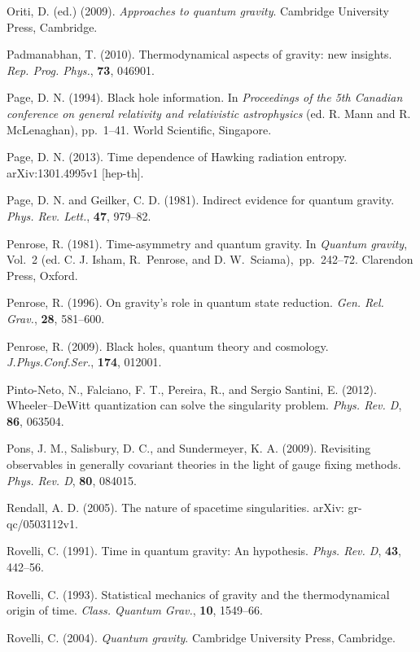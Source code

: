 \documentclass[12pt,a4paper]{article}
\begin{document}
\bibitem{} Oriti, D. (ed.) (2009). {\em Approaches to quantum
           gravity}. Cambridge University Press, Cambridge. 

\bibitem{} Padmanabhan, T. (2010). Thermodynamical aspects of gravity:
new insights. {\em Rep. Prog. Phys.}, {\bf 73}, 046901.

\bibitem{} Page, D. N. (1994). Black hole information. In {\em
    Proceedings of the 5th Canadian conference on general relativity
    and relativistic astrophysics} (ed. R. Mann and R. McLenaghan),
  pp.~1--41. World Scientific, Singapore. 

\bibitem{} Page, D. N. (2013). Time dependence of Hawking radiation
  entropy. arXiv:1301.4995v1 [hep-th].

\bibitem{} Page, D. N. and Geilker, C. D. (1981). Indirect evidence
           for quantum gravity. {\em Phys. Rev. Lett.}, {\bf 47},
           979--82.

\bibitem{} Penrose, R. (1981). Time-asymmetry and quantum gravity.
           In {\em Quantum gravity}, Vol.~2 (ed. C. J. Isham,
           R.~Penrose, and D. W.~Sciama),~pp.~242--72. Clarendon Press, Oxford.

\bibitem{} Penrose, R. (1996). On gravity's role in quantum state reduction.
           {\em Gen. Rel. Grav.}, {\bf 28}, 581--600.

\bibitem{} Penrose, R. (2009).  	
Black holes, quantum theory and cosmology.
{\em J.Phys.Conf.Ser.}, {\bf 174}, 012001.

\bibitem{} Pinto-Neto, N., Falciano, F. T., Pereira, R., and Sergio
  Santini, E. (2012). Wheeler--DeWitt quantization can solve the
  singularity problem. {\em Phys. Rev. D}, {\bf 86}, 063504.

\bibitem{} Pons, J. M., Salisbury, D. C., and Sundermeyer,
K. A. (2009).
Revisiting observables in generally covariant theories in the light of
gauge fixing methods. {\em Phys. Rev. D}, {\bf 80}, 084015.

\bibitem{} Rendall, A. D. (2005). The nature of spacetime
  singularities. arXiv: gr-qc/0503112v1. 

\bibitem{} Rovelli, C. (1991). Time in quantum gravity: An hypothesis.
 {\em Phys. Rev. D}, {\bf 43}, 442--56.

\bibitem{} Rovelli, C. (1993). Statistical mechanics of gravity and
  the thermodynamical origin of time. {\em Class. Quantum Grav.}, {\bf
    10},  1549--66. 

\bibitem{} Rovelli, C. (2004). {\em Quantum gravity}. Cambridge University
           Press, Cambridge.
\end{document}
